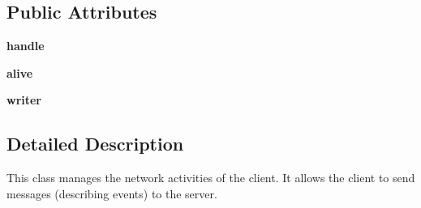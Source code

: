 \subsection*{\-Public \-Attributes}
\begin{DoxyCompactItemize}
\item 
\hypertarget{classsrc_1_1network_1_1_network_client_a156d68736ff3ba58e762c75ae4dee23c}{{\bfseries handle}}\label{classsrc_1_1network_1_1_network_client_a156d68736ff3ba58e762c75ae4dee23c}

\item 
\hypertarget{classsrc_1_1network_1_1_network_client_a2810710f068542108ae53baca2185484}{{\bfseries alive}}\label{classsrc_1_1network_1_1_network_client_a2810710f068542108ae53baca2185484}

\item 
\hypertarget{classsrc_1_1network_1_1_network_client_a2960edd599393fff10272e5cb964c89f}{{\bfseries writer}}\label{classsrc_1_1network_1_1_network_client_a2960edd599393fff10272e5cb964c89f}

\end{DoxyCompactItemize}


\subsection{\-Detailed \-Description}
\begin{DoxyVerb}
This class manages the network activities of the client.
It allows the client to send messages (describing events) to the server.
\end{DoxyVerb}
 

